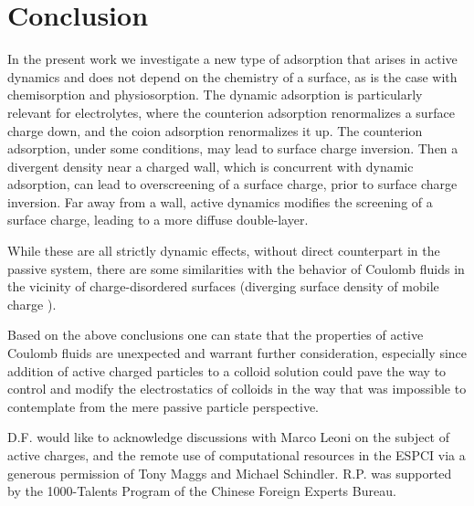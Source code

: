 \documentclass[pre,twocolumn,graphicx]{revtex4-1}
\begin{document}
\section{Conclusion}
\label{sec:conclusion}


In the present work we investigate a new type of adsorption that arises in active
dynamics and does not depend on the chemistry of a surface, as is the case with 
chemisorption and physiosorption.  The dynamic adsorption 
is particularly relevant for electrolytes, where the counterion adsorption 
renormalizes a surface charge down, and the coion adsorption renormalizes it up.  
The counterion adsorption, under some
conditions, may lead to surface charge inversion.  Then a divergent density near a 
charged wall, which is concurrent with dynamic adsorption, can lead to overscreening of
a surface charge, prior to surface charge inversion.  
Far away from a wall, active dynamics modifies the screening of a surface charge, 
leading to a more diffuse double-layer.  


While these are all strictly dynamic 
effects, without direct counterpart in the passive system, there are some similarities with the
behavior of Coulomb fluids in the vicinity of charge-disordered surfaces (diverging surface 
density of mobile charge \cite{Rudi15a}).  


Based on the above conclusions one can state that the properties of active Coulomb fluids are 
unexpected and warrant further consideration, especially since addition of active charged 
particles to a colloid solution could pave the way to control and modify the electrostatics of 
colloids in the way that was impossible to contemplate from the mere passive particle perspective. 










\begin{acknowledgments}
D.F. would like to acknowledge discussions with Marco Leoni on the subject of 
active charges, and the remote use of computational 
resources in the ESPCI via a generous permission of Tony Maggs and Michael Schindler.  
R.P. was supported by the 1000-Talents Program of the Chinese Foreign Experts Bureau.
\end{acknowledgments}




\appendix
\end{document}
